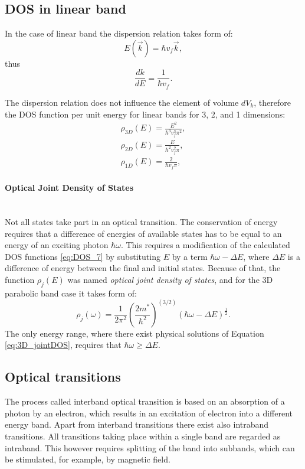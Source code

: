 \documentclass[titlepage,a4paper]{book}
\newcommand{\wciecie}{\quad\phantom{v}}
\newcommand{\myparagraph}[1]{\paragraph{#1}\mbox{}\\}
\begin{document}
\subsection{DOS in linear band}
\wciecie
In the case of linear band the dispersion relation takes form of:
\begin{equation}
\label{eq:DOS_lin1}
E(\vec{k}) = \hbar v_f \vec{k},
\end{equation}
thus
\begin{equation}
\label{eq:DOS_lin2}
\frac{dk}{dE} = \frac{1}{\hbar v_f}.
\end{equation}

The dispersion relation does not influence the element of volume $dV_k$, therefore the DOS function per unit energy for linear bands for 3, 2, and 1 dimensions:
\begin{eqnarray}
\label{eq:DOS_lin4}
\rho_{3D}(E) = \frac{E^2}{\hbar^3 v_f^3 \pi^2}, \\
\rho_{2D}(E) = \frac{E}{\hbar^2 v_f^2 \pi},\\
\rho_{1D}(E) = \frac{2}{\hbar v_f \pi},
\end{eqnarray}

\myparagraph{Optical Joint Density of States}
\wciecie
Not all states take part in an optical transition. The conservation of energy requires that a difference of energies of available states has to be equal to an energy of an exciting photon $\hbar\omega$. This requires a modification of the calculated DOS functions \ref{eq:DOS_7} by substituting $E$ by a term $\hbar\omega-\Delta E$, where $\Delta E$ is a difference of energy between the final and initial states. Because of that, the function $\rho_j (E)$ was named \textit{optical joint density of states}, and for the 3D parabolic band case it takes form of:
\begin{equation}
\label{eq:3D_jointDOS}
\rho_j (\omega) = \frac{1}{2\pi^2} \left(\frac{2m^*}{\hbar^2} \right)^{(3/2)} (\hbar\omega-\Delta E)^{\frac{1}{2}}.
\end{equation}
The only energy range, where there exist physical solutions of Equation \ref{eq:3D_jointDOS}, requires that $\hbar\omega \geq \Delta E$.

\subsection{Optical transitions}
\wciecie
The process called interband optical transition is based on an absorption of a photon by an electron, which results in an excitation of electron into a different energy band. Apart from interband transitions there exist also intraband transitions. All transitions taking place within a single band are regarded as intraband. This however requires splitting of the band into subbands, which can be stimulated, for example, by magnetic field.
\end{document}
